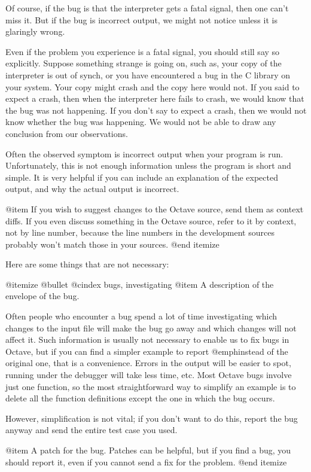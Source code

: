 Of course, if the bug is that the interpreter gets a fatal signal, then
one can't miss it.  But if the bug is incorrect output, we might not
notice unless it is glaringly wrong.

Even if the problem you experience is a fatal signal, you should still
say so explicitly.  Suppose something strange is going on, such as, your
copy of the interpreter is out of synch, or you have encountered a bug
in the C library on your system.  Your copy might crash and the copy
here would not.  If you said to expect a crash, then when the
interpreter here fails to crash, we would know that the bug was not
happening.  If you don't say to expect a crash, then we would not know
whether the bug was happening.  We would not be able to draw any
conclusion from our observations.

Often the observed symptom is incorrect output when your program is run.
Unfortunately, this is not enough information unless the program is
short and simple.  It is very helpful if you can include an explanation
of the expected output, and why the actual output is incorrect.

@item
If you wish to suggest changes to the Octave source, send them as
context diffs.  If you even discuss something in the Octave source,
refer to it by context, not by line number, because the line numbers in
the development sources probably won't match those in your sources.
@end itemize

Here are some things that are not necessary:

@itemize @bullet
@cindex bugs, investigating
@item
A description of the envelope of the bug.

Often people who encounter a bug spend a lot of time investigating which
changes to the input file will make the bug go away and which changes
will not affect it.  Such information is usually not necessary to enable
us to fix bugs in Octave, but if you can find a simpler example to
report @emph{instead} of the original one, that is a convenience.
Errors in the output will be easier to spot, running under the debugger
will take less time, etc. Most Octave bugs involve just one function, so
the most straightforward way to simplify an example is to delete all the
function definitions except the one in which the bug occurs.

However, simplification is not vital; if you don't want to do
this, report the bug anyway and send the entire test case you
used.

@item
A patch for the bug.  Patches can be helpful, but if you find a bug, you
should report it, even if you cannot send a fix for the problem.
@end itemize


